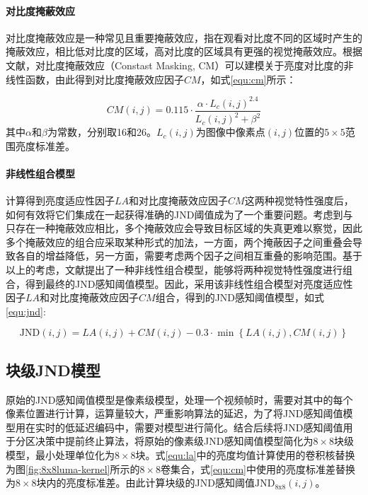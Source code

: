   \paragraph{对比度掩蔽效应} 对比度掩蔽效应是一种常见且重要掩蔽效应，指在观看对比度不同的区域时产生的掩蔽效应，相比低对比度的区域，高对比度的区域具有更强的视觉掩蔽效应。根据文献\cite{wuPatternMaskingEstimation2013}，对比度掩蔽效应（Constast Masking, CM）可以建模关于亮度对比度的非线性函数，由此得到对比度掩蔽效应因子$CM$，如式\ref{equ:cm}所示：

  \begin{equation} \label{equ:cm}
    CM(i, j) = 0.115 \cdot \frac{\alpha \cdot L_c(i, j)^{2.4}}{L_c(i, j)^2 + \beta^2}
  \end{equation}
  其中$\alpha$和$\beta$为常数，分别取16和26。$L_c(i, j)$为图像中像素点$(i, j)$位置的$5\times 5$范围亮度标准差。

  \paragraph{非线性组合模型} 计算得到亮度适应性因子$LA$和对比度掩蔽效应因子$CM$这两种视觉特性强度后，如何有效将它们集成在一起获得准确的JND阈值成为了一个重要问题。考虑到与只存在一种掩蔽效应相比，多个掩蔽效应会导致目标区域的失真更难以察觉，因此多个掩蔽效应的组合应采取某种形式的加法，一方面，两个掩蔽因子之间重叠会导致各自的增益降低，另一方面，需要考虑两个因子之间相互重叠的影响范围。基于以上的考虑，文献\cite{yangJustNoticeableDistortion2005}提出了一种非线性组合模型，能够将两种视觉特性强度进行组合，得到最终的JND感知阈值模型。因此，采用该非线性组合模型对亮度适应性因子$LA$和对比度掩蔽效应因子$CM$组合，得到的JND感知阈值模型，如式\ref{equ:jnd}:

  \begin{equation} \label{equ:jnd}
    \mathrm{JND}(i, j) = LA(i, j) + CM(i, j) - 0.3 \cdot \min \left\{LA(i, j) , CM(i, j)\right\}
  \end{equation}



	\subsection{块级JND模型\label{sec:blk-based-jnd}}
	原始的JND感知阈值模型是像素级模型，处理一个视频帧时，需要对其中的每个像素位置进行计算，运算量较大，严重影响算法的延迟，为了将JND感知阈值模型用在实时的低延迟编码中，需要对模型进行简化。结合后续将JND感知阈值用于分区决策中提前终止算法，将原始的像素级JND感知阈值模型简化为$8\times 8$块级模型，最小处理单位化为$8\times 8$块。式\ref{equ:la}中的亮度均值计算使用的卷积核替换为图\ref{fig:8x8luma-kernel}所示的$8\times 8$卷集合，式\ref{equ:cm}中使用的亮度标准差替换为$8\times 8$块内的亮度标准差。由此计算块级的JND感知阈值$\mathrm{JND_{8x8}}(i, j)$。

